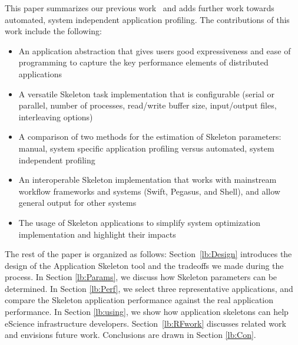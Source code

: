 \documentclass[preprint,12pt]{elsarticle}
\begin{document}


This paper summarizes our previous work~\cite{Skeleton2013,Skeleton2014} and adds further work towards automated, system independent application profiling. 
The contributions of this work include the following:
\begin{itemize}
\item An application abstraction that gives users good expressiveness and ease of programming to capture the key performance elements of distributed applications
\item A versatile Skeleton task implementation that is configurable (serial or parallel, number of processes, read/write buffer size, input/output files, interleaving options)
\item A comparison of two methods for the estimation
    of Skeleton parameters: manual, system specific application profiling
    versus automated, system independent profiling 
\item An interoperable Skeleton implementation that works with mainstream workflow frameworks and systems (Swift, Pegasus, and Shell), and allow general output for other systems
\item The usage of Skeleton applications to simplify system optimization implementation and highlight their impacts
\end{itemize}

The rest of the paper is organized as follows: 
Section~\ref{lb:Design} introduces the design of the Application Skeleton tool and the tradeoffs we made during the process.
In Section \ref{lb:Params}, we discuss how Skeleton parameters can be determined.
In Section \ref{lb:Perf}, we select three representative applications, and compare the Skeleton application performance against the real application performance. In Section \ref{lb:using}, we show how application skeletons can help eScience infrastructure developers.
Section~\ref{lb:RFwork} discusses related work and envisions future work.
Conclusions are drawn in Section \ref{lb:Con}. 
\end{document}

